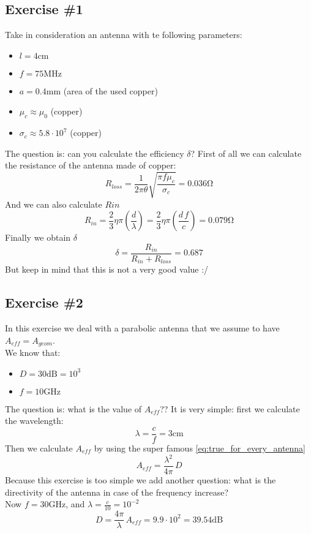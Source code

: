 \subsection*{Exercise \#1}
Take in consideration an antenna with te following parameters:
\begin{multicols}{2}
    \begin{itemize}
    \item $l=4\si{\centi\metre}$
    \item $f=75\si{\mega\hertz}$
    \item $a=0.4\si{\milli\metre}$ (area of the used copper)
    \item $\mu_c\approx\mu_0$ (copper)
    \item $\sigma_c\approx5.8 \cdot 10^7$ (copper)
    \end{itemize}
\end{multicols}
The question is: can you calculate the efficiency $\delta$?
First of all we can calculate the resistance of the antenna made of copper:
\begin{equation*}
    R_{loss}=\frac{1}{2\pi \theta}\sqrt{\frac{\pi f\mu_c}{\sigma_c}}=0.036\si{\ohm}
\end{equation*}
And we can also calculate $R{in}$
\begin{equation*}
    R_{in}=\frac{2}{3}\eta \pi \left(\frac{d}{\lambda}\right)=\frac{2}{3}\eta \pi \left(\frac{d\,f}{c}\right)=0.079\si{\ohm}
\end{equation*}
Finally we obtain $\delta$
\begin{equation*}
    \delta=\frac{R_{in}}{R_{in}+R_{loss}}=0.687
\end{equation*}
But keep in mind that this is not a very good value :/
\subsection*{Exercise \#2}
In this exercise we deal with a parabolic antenna that we assume to have $A_{eff}=A_{geom}$.\\
We know that:
\begin{itemize}
    \item $D=30\si{\deci \bel}=10^3$
    \item $f=10\si{\giga\hertz}$
\end{itemize}
The question is: what is the value of $A_{eff}$??
It is very simple: first we calculate the wavelength:
\begin{equation*}
    \lambda=\frac{c}{f}=3\si{\centi\metre}
\end{equation*}
Then we calculate $A_{eff}$ by using the super famous \cref{eq:true_for_every_antenna}
\begin{equation*}
    A_{eff}=\frac{\lambda^2}{4\pi}\,D
\end{equation*}
Because this exercise is too simple we add another question: what is the directivity of the antenna in case of the frequency increase?\\
Now $f=30\si{\giga\hertz}$, and $\lambda=\frac{c}{10}=10^{-2}$
\begin{equation*}
    D=\frac{4\pi}{\lambda}\,A_{eff}=9.9\cdot10^2=39.54\si{\deci\bel}
\end{equation*}